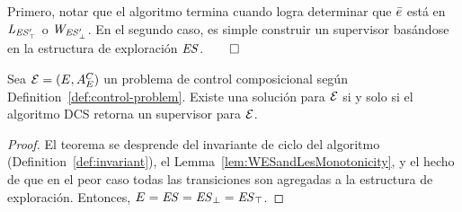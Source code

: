 Primero, notar que el algoritmo termina cuando logra determinar que $\bar{e}$ está en $\mathit{L_{\mathit{\mathit{ES}'_{\top}}}}$ o $\mathit{W_{\mathit{\mathit{ES}'_{\bot}}}}$. En el segundo caso, es simple construir un supervisor basándose en la estructura de exploración
$\mathit{ES}$.\hfill$\qed$

\begin{theorem}
Sea $\mathcal{E} = (E,A_E^C)$ un problema de control composicional según Definition~\ref{def:control-problem}. Existe una solución para $\mathcal{E}$ si y solo si el algoritmo DCS retorna un supervisor para $\mathcal{E}$.
\end{theorem}

\begin{proof}
El teorema se desprende del invariante de ciclo del algoritmo (Definition~\ref{def:invariant}), el
Lemma~\ref{lem:WESandLesMonotonicity}, y el hecho de que en el peor caso todas las transiciones son agregadas a la estructura de exploración. Entonces,  $E = \mathit{ES} = 
\mathit{\mathit{ES}_{\bot}} = \mathit{\mathit{ES}_{\top}}$.
\end{proof}